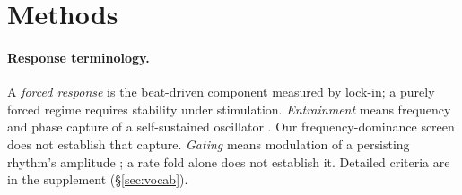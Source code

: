 \documentclass[11pt,a4paper]{article}
\providecommand{\DIFaddtex}[1]{{\protect\color{blue} \sf #1}} %
\providecommand{\DIFaddbegin}{} %
\providecommand{\DIFdelbegin}{} %
\providecommand{\DIFdelend}{} %
\providecommand{\DIFadd}[1]{\texorpdfstring{\DIFaddtex{#1}}{#1}} %
\begin{document}
\DIFdelbegin %

\DIFdelend \section{Methods}

\DIFaddbegin \paragraph{\DIFadd{Response terminology.}}\label{sec:vocab-methods}
\DIFadd{A \emph{forced response} is the beat-driven component measured by lock-in; a purely
forced regime requires stability under stimulation. \emph{Entrainment} means
frequency and phase capture of a self-sustained oscillator \cite{pikovsky2001}.
Our frequency-dominance screen does not establish that capture. \emph{Gating}
means modulation of a persisting rhythm's amplitude \cite{canolty2010,tort2010};
a rate fold alone does not establish it. Detailed criteria are in the supplement
(\S\ref{sec:vocab}).
}
\end{document}
